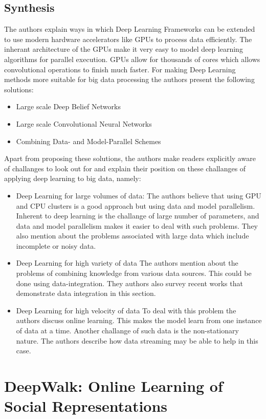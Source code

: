 \documentclass[12pt]{extarticle}
\begin{document}
\subsection{Synthesis}
The authors explain ways in which Deep Learning Frameworks can be extended to use
modern hardware accelerators like GPUs to process data efficiently.
%
The inherant architecture of the GPUs make it very easy to model deep learning
algorithms for parallel execution.
%
GPUs allow for thousands of cores which allows convolutional operations to finish
much faster.
%
For making Deep Learning methods more suitable for big data processing the authors
present the following solutions:
\begin{itemize}
\item Large scale Deep Belief Networks
\item Large scale Convolutional Neural Networks
\item Combining Data- and Model-Parallel Schemes
\end{itemize}
Apart from proposing these solutions, the authors make readers explicitly aware of
challanges to look out for and explain their position on these challanges of applying
deep learning to big data, namely:
\begin{itemize}
\item Deep Learning for large volumes of data:
%
The authors believe that using GPU and CPU clusters is a good approach but using
data and model parallelism.
%
Inherent to deep learning is the challange of large number of parameters, and data
and model parallelism makes it easier to deal with such problems.
%
They also mention about the problems associated with large data which include
incomplete or noisy data.
%
\item Deep Learning for high variety of data
%
The authors mention about the problems of combining knowledge from various data
sources.
%
This could be done using data-integration.
%
They authors also survey recent works that demonstrate data integration in this
section.
%
\item Deep Learning for high velocity of data
%
To deal with this problem the authors discuss online learning.
%
This makes the model learn from one instance of data at a time.
%
Another challange of such data is the non-stationary nature.
%
The authors describe how data streaming may be able to help in this case.
\end{itemize}



\section{DeepWalk: Online Learning of Social Representations}
\end{document}
